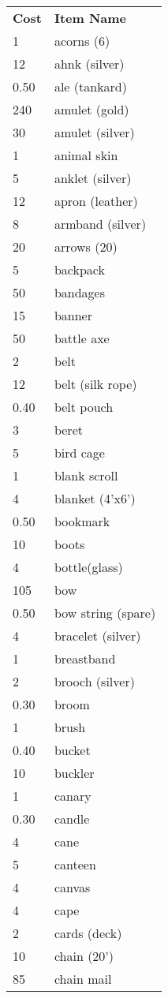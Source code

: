 \begin{normbox}[Equipment]
\begin{tabularx}{\linewidth}{@{} l X }
\small
\textbf{Cost} & \textbf{Item Name}\\
1 & acorns (6)\\
12 & ahnk (silver)\\
0.50 & ale (tankard)\\
240 & amulet (gold)\\
30 & amulet (silver)\\
1 & animal skin\\
5 & anklet (silver)\\
12 & apron (leather)\\
8 & armband (silver)\\
20 & arrows (20)\\
5 & backpack\\
50 & bandages\\
15 & banner\\
50 & battle axe\\
2 & belt\\
12 & belt (silk rope)\\
0.40 & belt pouch\\
3 & beret\\
5 & bird cage\\
1 & blank scroll\\
4 & blanket (4'x6')\\
0.50 & bookmark\\
10 & boots\\
4 & bottle(glass)\\
105 & bow\\
0.50 & bow string (spare)\\
4 & bracelet (silver)\\
1 & breastband\\
2 & brooch (silver)\\
0.30 & broom\\
1 & brush\\
0.40 & bucket\\
10 & buckler\\
1 & canary\\
0.30 & candle\\
4 & cane\\
5 & canteen\\
4 & canvas\\
4 & cape\\
2 & cards (deck)\\
10 & chain (20')\\
85 & chain mail\\

\end{tabularx}
\end{normbox}
